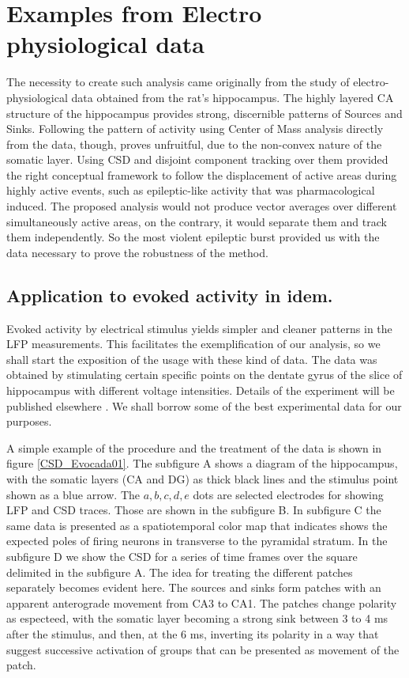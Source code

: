 \documentclass{article}
\begin{document}
 
\section{Examples from Electro physiological data}

The necessity to create such analysis came originally from the study of electro-physiological data obtained from the rat's hippocampus. The highly layered CA structure of the hippocampus provides strong, discernible patterns of Sources and Sinks. Following the pattern of activity using Center of Mass analysis directly from the data, though, proves unfruitful, due to the non-convex nature of the somatic layer. Using CSD and disjoint component tracking over them provided the right conceptual framework to follow the displacement of active areas during highly active events, such as epileptic-like activity that was pharmacological induced. The proposed analysis would not produce vector averages over different simultaneously active areas, on the contrary, it would separate them and track them independently. So the most violent epileptic burst provided us with the data necessary to prove the robustness of the method. 

\subsection{Application to evoked activity in idem.}\label{sec:evocada}

Evoked activity by electrical stimulus yields simpler and cleaner patterns in the LFP
measurements. This facilitates the exemplification of our analysis, so we shall
start the exposition of the usage with these kind of data.
The data was obtained by stimulating certain specific points on the dentate gyrus
of the slice of hippocampus with different voltage intensities. Details of the experiment
will be published elsewhere \cite{FrancoGut2017}. We shall borrow some of
the best experimental data for our purposes.

A simple example of the procedure and the treatment of the data is shown in figure
\ref{CSD_Evocada01}.  The subfigure A  shows a diagram of the hippocampus, with
the somatic layers (CA and DG) as thick black lines and the stimulus point
shown as a blue arrow. The $a,b,c,d,e$ dots are selected electrodes for
showing LFP and CSD traces. Those are shown in the subfigure B. In subfigure
C the same data is presented as a spatiotemporal color map that
indicates shows the expected poles of firing neurons in transverse to the
pyramidal stratum.  In the subfigure D we show the CSD for a series of time frames
over the square delimited in the subfigure A. The idea for treating the different
patches separately becomes evident here. The sources and sinks form patches
with an apparent anterograde movement from CA3 to CA1. The patches change polarity
as especteed, with the somatic layer becoming a strong sink between 3 to 4 ms
after the stimulus, and then, at the 6 ms, inverting its polarity in a way that suggest
successive activation of groups that can be presented as movement of the patch.
\end{document}
